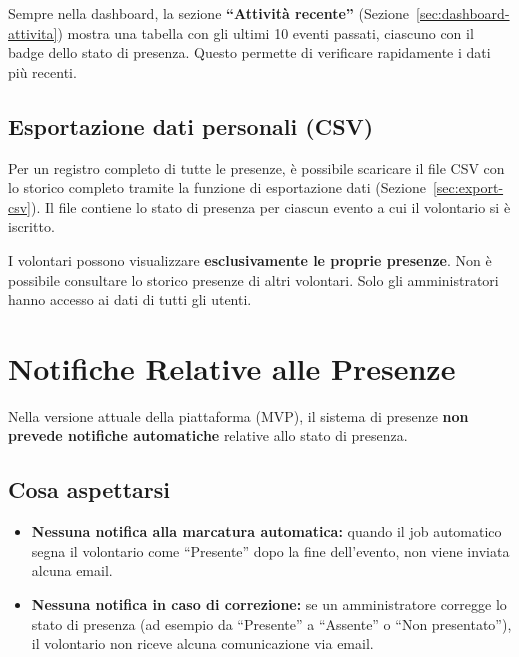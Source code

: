 \documentclass[a4paper,11pt,oneside]{book}
\begin{document}
Sempre nella dashboard, la sezione \textbf{``Attivit\`a recente''} (Sezione~\ref{sec:dashboard-attivita}) mostra una tabella con gli ultimi 10 eventi passati, ciascuno con il badge dello stato di presenza. Questo permette di verificare rapidamente i dati pi\`u recenti.

\subsection{Esportazione dati personali (CSV)}

Per un registro completo di tutte le presenze, \`e possibile scaricare il file CSV con lo storico completo tramite la funzione di esportazione dati (Sezione~\ref{sec:export-csv}). Il file contiene lo stato di presenza per ciascun evento a cui il volontario si \`e iscritto.

\begin{warningbox}
I volontari possono visualizzare \textbf{esclusivamente le proprie presenze}. Non \`e possibile consultare lo storico presenze di altri volontari. Solo gli amministratori hanno accesso ai dati di tutti gli utenti.
\end{warningbox}

\section{Notifiche Relative alle Presenze}
\label{sec:notifiche-presenze}

Nella versione attuale della piattaforma (MVP), il sistema di presenze \textbf{non prevede notifiche automatiche} relative allo stato di presenza.

\subsection{Cosa aspettarsi}

\begin{itemize}[leftmargin=1.5em]
  \item \textbf{Nessuna notifica alla marcatura automatica:} quando il job automatico segna il volontario come ``Presente'' dopo la fine dell'evento, non viene inviata alcuna email.
  \item \textbf{Nessuna notifica in caso di correzione:} se un amministratore corregge lo stato di presenza (ad esempio da ``Presente'' a ``Assente'' o ``Non presentato''), il volontario non riceve alcuna comunicazione via email.
\end{itemize}
\end{document}
